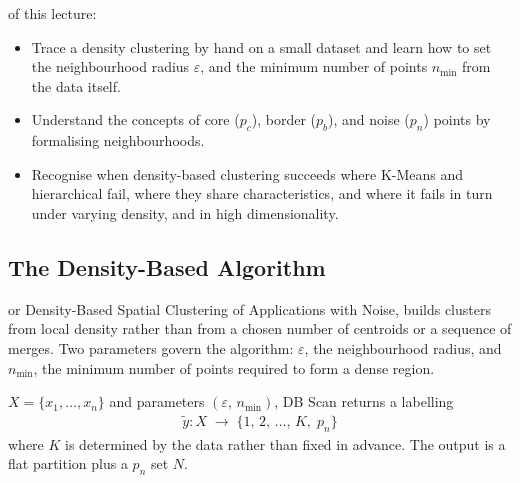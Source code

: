  of this lecture:
\begin{itemize}
    \item Trace a density clustering by hand on a small dataset and learn how to set the neighbourhood radius $\varepsilon$, 
    and the minimum number of points $n_{\min}$ from the data itself.
    \item Understand the concepts of core ($p_c$), border ($p_b$), and noise ($p_n$) points by formalising neighbourhoods.
    \item Recognise when density-based clustering succeeds where K-Means and hierarchical fail, where they share characteristics, and where it fails in 
    turn under varying density, and in high dimensionality.
\end{itemize}









\newpage

\subsection{The Density-Based Algorithm}

\cite{Ester1996} or Density-Based Spatial Clustering of Applications with Noise, 
builds clusters from local density rather than from a chosen number of centroids or a sequence of merges.
Two parameters govern the algorithm: $\varepsilon$, the neighbourhood radius, and $n_{\min}$, 
the minimum number of points required to form a dense region.

\vspace{1.5em}

 $X = \{x_1,\ldots,x_n\}$ and parameters $(\varepsilon,\,n_{\min})$, DB Scan returns a labelling
\begin{align*}
    \tilde{y}: X \;\longrightarrow\; \{1,\,2,\,\ldots,\,K,\;p_n\}
\end{align*}
where $K$ is determined by the data rather than fixed in advance. The output is a flat partition plus a $p_n$ set $N$.

